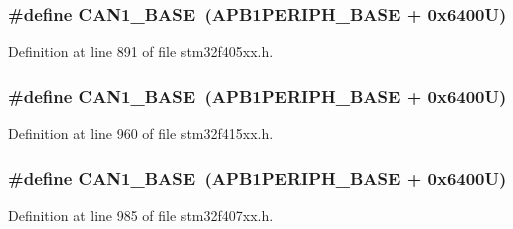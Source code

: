 \subsubsection[{\texorpdfstring{C\+A\+N1\+\_\+\+B\+A\+SE}{CAN1_BASE}}]{\setlength{\rightskip}{0pt plus 5cm}\#define C\+A\+N1\+\_\+\+B\+A\+SE~({\bf A\+P\+B1\+P\+E\+R\+I\+P\+H\+\_\+\+B\+A\+SE} + 0x6400\+U)}\hypertarget{group___peripheral__registers__structures_gad8e45ea6c032d9fce1b0516fff9d8eaa}{}\label{group___peripheral__registers__structures_gad8e45ea6c032d9fce1b0516fff9d8eaa}


Definition at line 891 of file stm32f405xx.\+h.

\subsubsection[{\texorpdfstring{C\+A\+N1\+\_\+\+B\+A\+SE}{CAN1_BASE}}]{\setlength{\rightskip}{0pt plus 5cm}\#define C\+A\+N1\+\_\+\+B\+A\+SE~({\bf A\+P\+B1\+P\+E\+R\+I\+P\+H\+\_\+\+B\+A\+SE} + 0x6400\+U)}\hypertarget{group___peripheral__registers__structures_gad8e45ea6c032d9fce1b0516fff9d8eaa}{}\label{group___peripheral__registers__structures_gad8e45ea6c032d9fce1b0516fff9d8eaa}


Definition at line 960 of file stm32f415xx.\+h.

\subsubsection[{\texorpdfstring{C\+A\+N1\+\_\+\+B\+A\+SE}{CAN1_BASE}}]{\setlength{\rightskip}{0pt plus 5cm}\#define C\+A\+N1\+\_\+\+B\+A\+SE~({\bf A\+P\+B1\+P\+E\+R\+I\+P\+H\+\_\+\+B\+A\+SE} + 0x6400\+U)}\hypertarget{group___peripheral__registers__structures_gad8e45ea6c032d9fce1b0516fff9d8eaa}{}\label{group___peripheral__registers__structures_gad8e45ea6c032d9fce1b0516fff9d8eaa}


Definition at line 985 of file stm32f407xx.\+h.

